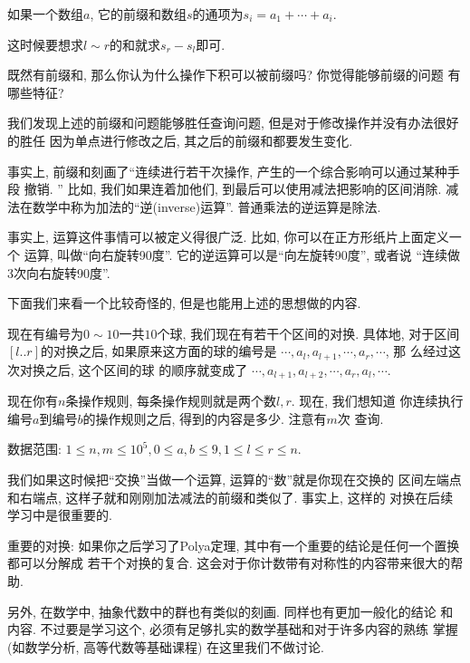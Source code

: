 \begin{definition}
    如果一个数组$a$, 它的前缀和数组$s$的通项为$s_i = a_1 + \cdots + a_i$. 
\end{definition}

这时候要想求$l\sim r$的和就求$s_r - s_l$即可. 

\begin{ques}
    既然有前缀和, 那么你认为什么操作下积可以被前缀吗? 你觉得能够前缀的问题
    有哪些特征?  
\end{ques}

我们发现上述的前缀和问题能够胜任查询问题, 但是对于修改操作并没有办法很好的胜任
因为单点进行修改之后, 其之后的前缀和都要发生变化. 

事实上, 前缀和刻画了``连续进行若干次操作, 产生的一个综合影响可以通过某种手段
撤销. '' 比如, 我们如果连着加他们, 到最后可以使用减法把影响的区间消除. 
减法在数学中称为加法的``逆(inverse)运算''. 普通乘法的逆运算是除法. 

事实上, 运算这件事情可以被定义得很广泛. 比如, 你可以在正方形纸片上面定义一个
运算, 叫做``向右旋转90度''. 它的逆运算可以是``向左旋转90度'', 或者说
``连续做3次向右旋转90度''. 

下面我们来看一个比较奇怪的, 但是也能用上述的思想做的内容. 

\begin{example}
    现在有编号为$0\sim 10$一共$10$个球, 我们现在有若干个区间的对换. 具体地, 
    对于区间$[l..r]$的对换之后, 如果原来这方面的球的编号是
    $\cdots, a_l, a_{l+1}, \cdots, a_r, \cdots$, 那
    么经过这次对换之后, 这个区间的球
    的顺序就变成了
    $\cdots, a_{l+1}, a_{l+2}, \cdots , a_r, a_l,\cdots $. 

    现在你有$n$条操作规则, 每条操作规则就是两个数$l,r$. 现在, 我们想知道
    你连续执行编号$a$到编号$b$的操作规则之后, 得到的内容是多少. 注意有$m$次
    查询. 

    数据范围: $1\leq n, m \leq 10^5, 0\leq a, b\leq 9, 1\leq l\leq r\leq n.$
\end{example}

我们如果这时候把``交换''当做一个运算, 运算的``数''就是你现在交换的
区间左端点和右端点, 这样子就和刚刚加法减法的前缀和类似了. 事实上, 这样的
对换在后续学习中是很重要的. 

\begin{remark}
    重要的对换: 如果你之后学习了Polya定理, 其中有一个重要的结论是任何一个置换都可以分解成
    若干个对换的复合. 这会对于你计数带有对称性的内容带来很大的帮助. 
    
    另外, 在数学中, 抽象代数中的群也有类似的刻画. 同样也有更加一般化的结论
    和内容. 不过要是学习这个, 必须有足够扎实的数学基础和对于许多内容的熟练
    掌握(如数学分析, 高等代数等基础课程)
    在这里我们不做讨论. 
\end{remark}

